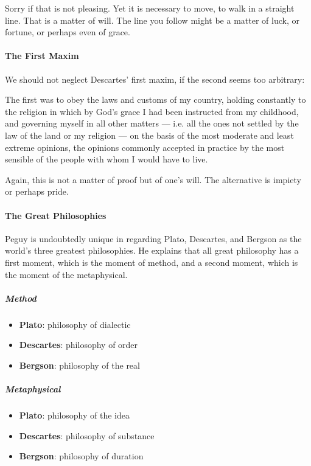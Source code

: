 Sorry if that is not pleasing. Yet it is necessary to move, to walk in a straight line. That is a matter of will. The line you follow might be a matter of luck, or fortune, or perhaps even of grace.

\paragraph{The First Maxim}


We should not neglect Descartes' first maxim, if the second seems too arbitrary:

\begin{quotex}
The first was to obey the laws and customs of my country, holding constantly to the religion in which by God's grace I had been instructed from my childhood, and governing myself in all other matters --- i.e. all the ones not settled by the law of the land or my religion --- on the basis of the most moderate and least extreme opinions, the opinions commonly accepted in practice by the most sensible of the people with whom I would have to live.
\end{quotex}


Again, this is not a matter of proof but of one's will. The alternative is impiety or perhaps pride.

\paragraph{The Great Philosophies}


Peguy is undoubtedly unique in regarding Plato, Descartes, and Bergson as the world's three greatest philosophies. He explains that all great philosophy has a first moment, which is the moment of method, and a second moment, which is the moment of the metaphysical.

\subparagraph{Method}


\begin{itemize}


\item \textbf{Plato}: philosophy of dialectic


\item \textbf{Descartes}: philosophy of order


\item \textbf{Bergson}: philosophy of the real

\end{itemize}


\subparagraph{Metaphysical}


\begin{itemize}


\item \textbf{Plato}: philosophy of the idea


\item \textbf{Descartes}: philosophy of substance


\item \textbf{Bergson}: philosophy of duration

\end{itemize}


